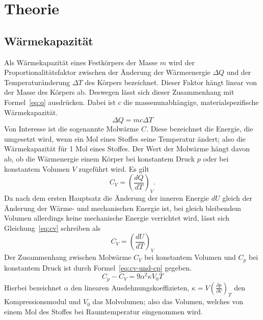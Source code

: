 
\section{Theorie}
\subsection{Wärmekapazität}
%
Als Wärmekapazität eines Festkörpers der Masse $m$ wird der 
Proportionalitätsfaktor zwischen der Änderung der Wärmeenergie 
$\Delta Q$ und der Temperaturänderung $\Delta T$ des Körpers 
bezeichnet. Dieser Faktor hängt linear von der Masse des Körpers ab. 
Deswegen lässt sich dieser Zusammenhang mit Formel~\eqref{eq:q} 
ausdrücken. Dabei ist $c$ die massenunabhängige, materialspezifische 
Wärmekapazität.
%
\begin{equation}
\label{eq:q}
\Delta Q = mc\Delta T
\end{equation}
%
Von Interesse ist die sogenannte Molwärme $C$. Diese bezeichnet 
die Energie, die umgesetzt wird, wenn ein Mol eines Stoffes seine 
Temperatur ändert; also die Wärmekapazität für 1 Mol eines Stoffes.
Der Wert der Molwärme hängt davon ab, ob die Wärmenergie einem Körper 
bei konstantem Druck $p$ oder bei konstantem Volumen $V$ zugeführt wird.
Es gilt
%
\begin{equation}
\label{eq:cv}
C_V = \left(\frac{dQ}{dT}\right)_V.
\end{equation}
%
Da nach dem ersten Hauptsatz die Änderung der inneren Energie $dU$ 
gleich der Änderung der Wärme- und mechanischen Energie ist, bei gleich 
bleibendem Volumen allerdings keine mechanische Energie verrichtet wird, 
lässt sich Gleichung~\eqref{eq:cv} schreiben als
%
\begin{equation}
C_V = \left(\frac{dU}{dT}\right)_V
\end{equation}
%
Der Zusammenhang zwischen Molwärme $C_V$ bei konstantem Volumen und 
$C_p$ bei konstantem Druck ist durch Formel~\eqref{eq:cv-und-cp}
gegeben.
%
\begin{equation}
\label{eq:cv-und-cp}
C_p - C_V = 9\alpha^2\kappa V_0T
\end{equation}
%
Hierbei bezeichnet $\alpha$ den linearen Ausdehnungskoeffizieten, 
$\kappa = V\left(\frac{\partial p}{\partial V}\right)_T$ den Kompressionsmodul 
und $V_0$ das Molvolumen; also das Volumen, welches von einem Mol des 
Stoffes bei Raumtemperatur eingenommen wird. 
%
